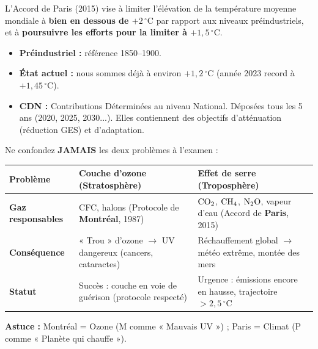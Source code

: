 \documentclass[11pt]{article}
\begin{document}
\begin{exemplebox}
L'Accord de Paris (2015) vise à limiter l'élévation de la température moyenne mondiale à \textbf{bien en dessous de $+2\,^\circ\mathrm{C}$} par rapport aux niveaux préindustriels, et à \textbf{poursuivre les efforts pour la limiter à $+1,5\,^\circ\mathrm{C}$}. 
\begin{itemize}
    \item \textbf{Préindustriel :} référence 1850--1900.
    \item \textbf{État actuel :} nous sommes déjà à environ $+1,2\,^\circ\mathrm{C}$ (année 2023 record à $+1,45\,^\circ\mathrm{C}$).
    \item \textbf{CDN :} Contributions Déterminées au niveau National. Déposées tous les 5 ans (2020, 2025, 2030...). Elles contiennent des objectifs d'atténuation (réduction GES) et d'adaptation.
\end{itemize}
\end{exemplebox}

\begin{attention}
Ne confondez \textbf{JAMAIS} les deux problèmes à l'examen :
\begin{center}
\begin{tabularx}{\linewidth}{|l|X|X|}\hline
\rowcolor{popblueL} \textbf{Problème} & \textbf{Couche d'ozone (Stratosphère)} & \textbf{Effet de serre (Troposphère)} \\ \hline
\textbf{Gaz responsables} & CFC, halons (Protocole de \textbf{Montréal}, 1987) & $\ce{CO2}$, $\ce{CH4}$, $\ce{N2O}$, vapeur d'eau (Accord de \textbf{Paris}, 2015) \\ \hline
\textbf{Conséquence} & « Trou » d'ozone $\rightarrow$ UV dangereux (cancers, cataractes) & Réchauffement global $\rightarrow$ météo extrême, montée des mers \\ \hline
\textbf{Statut} & Succès : couche en voie de guérison (protocole respecté) & Urgence : émissions encore en hausse, trajectoire $>2,5\,^\circ\mathrm{C}$ \\ \hline
\end{tabularx}
\end{center}
\textbf{Astuce :} Montréal = Ozone (M comme « Mauvais UV ») ; Paris = Climat (P comme « Planète qui chauffe »).
\end{attention}
\end{document}

